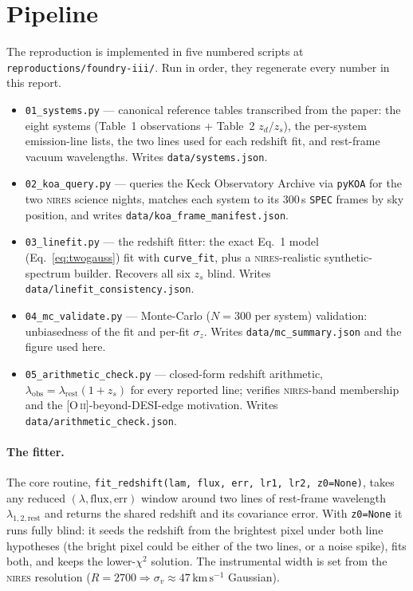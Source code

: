 \documentclass[11pt,letterpaper]{article}
\newcommand{\zs}{\ensuremath{z_s}}
\newcommand{\zd}{\ensuremath{z_d}}
\newcommand{\kms}{\ensuremath{\,\mathrm{km\,s^{-1}}}}
\newcommand{\NIRES}{\textsc{nires}}
\begin{document}
\section{Pipeline}

The reproduction is implemented in five numbered scripts at
\texttt{reproductions/foundry-iii/}. Run in order, they regenerate every
number in this report.

\begin{itemize}
\item \texttt{01\_systems.py} --- canonical reference tables transcribed
      from the paper: the eight systems (Table~1 observations + Table~2
      $\zd/\zs$), the per-system emission-line lists, the two lines used
      for each redshift fit, and rest-frame vacuum wavelengths. Writes
      \texttt{data/systems.json}.
\item \texttt{02\_koa\_query.py} --- queries the Keck Observatory Archive
      \citep{koa} via \texttt{pyKOA} \citep{pykoa} for the two \NIRES{}
      science nights, matches each system to its 300\,s \texttt{SPEC}
      frames by sky position, and writes \texttt{data/koa\_frame\_manifest.json}.
\item \texttt{03\_linefit.py} --- the redshift fitter: the exact Eq.~1
      model (Eq.~\ref{eq:twogauss}) fit with \texttt{curve\_fit}, plus a
      \NIRES-realistic synthetic-spectrum builder. Recovers all six \zs{}
      blind. Writes \texttt{data/linefit\_consistency.json}.
\item \texttt{04\_mc\_validate.py} --- Monte-Carlo ($N{=}300$ per system)
      validation: unbiasedness of the fit and per-fit $\sigma_z$.
      Writes \texttt{data/mc\_summary.json} and the figure used here.
\item \texttt{05\_arithmetic\_check.py} --- closed-form redshift
      arithmetic, $\lambda_{\mathrm{obs}} = \lambda_{\mathrm{rest}}(1+\zs)$
      for every reported line; verifies \NIRES-band membership and the
      [O\,\textsc{ii}]-beyond-DESI-edge motivation. Writes
      \texttt{data/arithmetic\_check.json}.
\end{itemize}

\paragraph{The fitter.} The core routine, \texttt{fit\_redshift(lam,
flux, err, lr1, lr2, z0=None)}, takes any reduced
$(\lambda, \mathrm{flux}, \mathrm{err})$ window around two lines of
rest-frame wavelength $\lambda_{1,2,\mathrm{rest}}$ and returns the
shared redshift and its covariance error. With \texttt{z0=None} it runs
fully blind: it seeds the redshift from the brightest pixel under both
line hypotheses (the bright pixel could be either of the two lines, or a
noise spike), fits both, and keeps the lower-$\chi^2$ solution. The
instrumental width is set from the \NIRES{} resolution
($R = 2700 \Rightarrow \sigma_v \approx 47\kms$ Gaussian).
\end{document}
